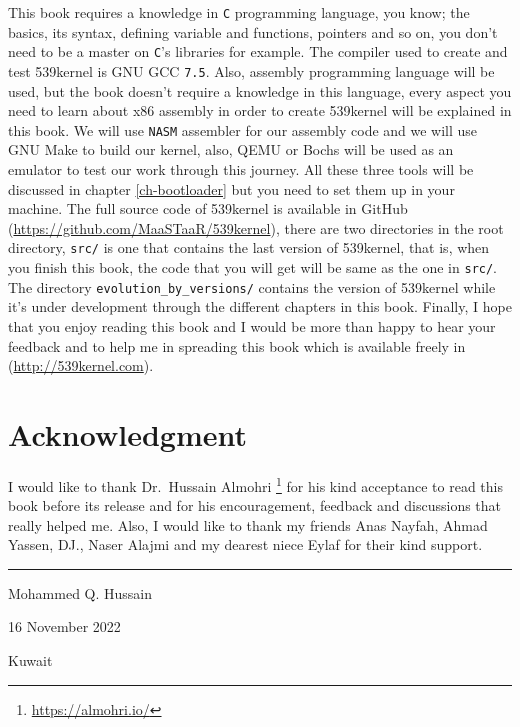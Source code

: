 This book requires a knowledge in \lstinline!C! programming language,
you know; the basics, its syntax, defining variable and functions,
pointers and so on, you don't need to be a master on \lstinline!C!'s
libraries for example. The compiler used to create and test 539kernel is
GNU GCC \lstinline!7.5!. Also, assembly programming language will be
used, but the book doesn't require a knowledge in this language, every
aspect you need to learn about x86 assembly in order to create 539kernel
will be explained in this book. We will use \lstinline!NASM! assembler
for our assembly code and we will use GNU Make to build our kernel,
also, QEMU or Bochs will be used as an emulator to test our work through
this journey. All these three tools will be discussed in chapter
\ref{ch-bootloader} but you need to set them up in your machine. The
full source code of 539kernel is available in GitHub
(\url{https://github.com/MaaSTaaR/539kernel}), there are two directories
in the root directory, \lstinline!src/! is one that contains the last
version of 539kernel, that is, when you finish this book, the code that
you will get will be same as the one in \lstinline!src/!. The directory
\lstinline!evolution_by_versions/! contains the version of 539kernel
while it's under development through the different chapters in this
book. Finally, I hope that you enjoy reading this book and I would be
more than happy to hear your feedback and to help me in spreading this
book which is available freely in (\url{http://539kernel.com}).

\section*{Acknowledgment}\label{acknowledgment}

I would like to thank Dr.~Hussain Almohri \footnote{\url{https://almohri.io/}}
for his kind acceptance to read this book before its release and for his
encouragement, feedback and discussions that really helped me. Also, I
would like to thank my friends Anas Nayfah, Ahmad Yassen, DJ., Naser
Alajmi and my dearest niece Eylaf for their kind support.

\begin{center}\rule{0.5\linewidth}{\linethickness}\end{center}

Mohammed Q. Hussain

16 November 2022

Kuwait
